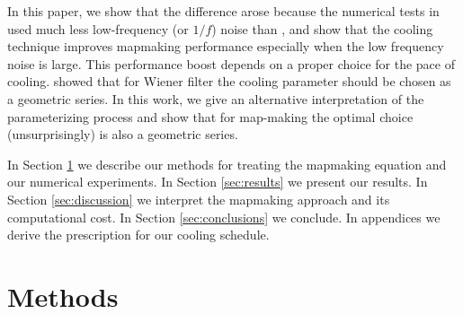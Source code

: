 \documentclass[twocolumn,linenumbers]{aastex631}
\DeclareMathOperator*{\argmin}{arg\,min}
\newcommand{\vbd}{\vb{d}}
\newcommand{\vbm}{\vb{m}}
\newcommand{\vbn}{\vb{n}}
\newcommand{\inv}[1]{#1^{-1}}
\newcommand{\hatm}{\vb{\hat{m}}}
\newcommand{\Pdagger}{P^{\dagger}}
\newcommand{\PPinv}[1]{\inv{\qty(\Pdagger #1 P)}}
\begin{document}
In this paper, we show that the difference arose because the numerical tests in \citet{2018A&A...620A..59P} used much less low-frequency (or $1/f$) noise than \citet{Huffenberger_2018}, and show that the cooling technique improves mapmaking performance especially when the low frequency noise is large.  This performance boost depends on a proper choice for the pace of cooling.  \citet{2017MNRAS.468.1782K} showed that for Wiener filter the cooling parameter should be chosen as a geometric series.  In this work, we give an alternative interpretation of the parameterizing process and show that for map-making the optimal choice (unsurprisingly) is also a geometric series.





In Section \ref{sec:methods} we describe our methods for treating the mapmaking equation and our numerical experiments.  In Section \ref{sec:results} we present our results. In Section \ref{sec:discussion} we interpret the mapmaking approach and its computational cost.  In Section \ref{sec:conclusions} we conclude.  In appendices we derive the prescription for our cooling schedule.


\section{Methods}\label{sec:methods}
\end{document}
